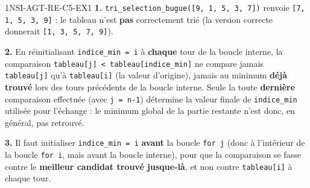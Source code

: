 
\begin{corrige}{1NSI-AGT-RE-C5-EX1}
\textbf{1.} \lstinline{tri_selection_bugue([9, 1, 5, 3, 7])} renvoie
\lstinline{[7, 1, 5, 3, 9]} : le tableau n'est \textbf{pas} correctement trié (la version
correcte donnerait \lstinline{[1, 3, 5, 7, 9]}).

\textbf{2.} En réinitialisant \lstinline{indice_min = i} à \textbf{chaque} tour de la
boucle interne, la comparaison \lstinline{tableau[j] < tableau[indice_min]} ne compare
jamais \lstinline{tableau[j]} qu'à \lstinline{tableau[i]} (la valeur d'origine), jamais au
minimum \textbf{déjà trouvé} lors des tours précédents de la boucle interne. Seule la toute
\textbf{dernière} comparaison effectuée (avec \lstinline{j = n-1}) détermine la valeur
finale de \lstinline{indice_min} utilisée pour l'échange : le minimum global de la partie
restante n'est donc, en général, pas retrouvé.

\textbf{3.} Il faut initialiser \lstinline{indice_min = i} \textbf{avant} la boucle
\lstinline{for j} (donc à l'intérieur de la boucle \lstinline{for i}, mais avant la boucle
interne), pour que la comparaison se fasse contre le \textbf{meilleur candidat trouvé
jusque-là}, et non contre \lstinline{tableau[i]} à chaque tour.
\end{corrige}
